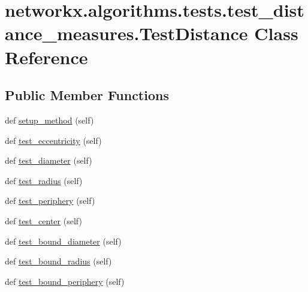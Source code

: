 \hypertarget{classnetworkx_1_1algorithms_1_1tests_1_1test__distance__measures_1_1TestDistance}{}\section{networkx.\+algorithms.\+tests.\+test\+\_\+distance\+\_\+measures.\+Test\+Distance Class Reference}
\label{classnetworkx_1_1algorithms_1_1tests_1_1test__distance__measures_1_1TestDistance}
\subsection*{Public Member Functions}
\begin{DoxyCompactItemize}
\item 
def \hyperlink{classnetworkx_1_1algorithms_1_1tests_1_1test__distance__measures_1_1TestDistance_acaa2a2d854662a22f081fd8b49706e5e}{setup\+\_\+method} (self)
\item 
def \hyperlink{classnetworkx_1_1algorithms_1_1tests_1_1test__distance__measures_1_1TestDistance_a413255e0b36be479bb268bfef118f00a}{test\+\_\+eccentricity} (self)
\item 
def \hyperlink{classnetworkx_1_1algorithms_1_1tests_1_1test__distance__measures_1_1TestDistance_a30db5fb14994f8c247674ac9273e9d23}{test\+\_\+diameter} (self)
\item 
def \hyperlink{classnetworkx_1_1algorithms_1_1tests_1_1test__distance__measures_1_1TestDistance_a58cc2cca3a9a93aa3661cf78eda1b181}{test\+\_\+radius} (self)
\item 
def \hyperlink{classnetworkx_1_1algorithms_1_1tests_1_1test__distance__measures_1_1TestDistance_a5234c7a5b8d8b9bf2e5e96c08e6f378f}{test\+\_\+periphery} (self)
\item 
def \hyperlink{classnetworkx_1_1algorithms_1_1tests_1_1test__distance__measures_1_1TestDistance_af0faaa7afb14e32b41bb2c6538282a57}{test\+\_\+center} (self)
\item 
def \hyperlink{classnetworkx_1_1algorithms_1_1tests_1_1test__distance__measures_1_1TestDistance_a5b183a9c12d772e2757a24e6601d4fd9}{test\+\_\+bound\+\_\+diameter} (self)
\item 
def \hyperlink{classnetworkx_1_1algorithms_1_1tests_1_1test__distance__measures_1_1TestDistance_af260eae7ac8f0334911cb9d033756364}{test\+\_\+bound\+\_\+radius} (self)
\item 
def \hyperlink{classnetworkx_1_1algorithms_1_1tests_1_1test__distance__measures_1_1TestDistance_a501ad27aee463eae1769b62219aca088}{test\+\_\+bound\+\_\+periphery} (self)

\end{DoxyCompactItemize}

